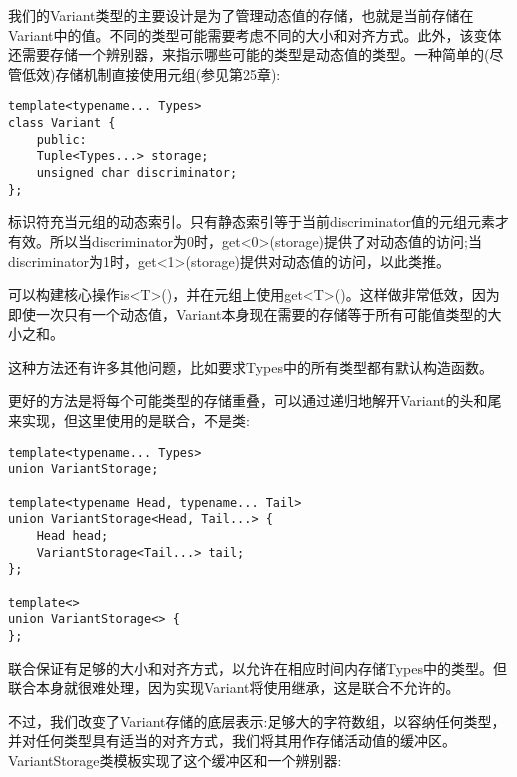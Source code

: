我们的Variant类型的主要设计是为了管理动态值的存储，也就是当前存储在Variant中的值。不同的类型可能需要考虑不同的大小和对齐方式。此外，该变体还需要存储一个辨别器，来指示哪些可能的类型是动态值的类型。一种简单的(尽管低效)存储机制直接使用元组(参见第25章):

\begin{lstlisting}[style=styleCXX]
template<typename... Types>
class Variant {
	public:
	Tuple<Types...> storage;
	unsigned char discriminator;
};
\end{lstlisting}

标识符充当元组的动态索引。只有静态索引等于当前discriminator值的元组元素才有效。所以当discriminator为0时，get<0>(storage)提供了对动态值的访问;当discriminator为1时，get<1>(storage)提供对动态值的访问，以此类推。

可以构建核心操作is<T>()，并在元组上使用get<T>()。这样做非常低效，因为即使一次只有一个动态值，Variant本身现在需要的存储等于所有可能值类型的大小之和。

\begin{tcolorbox}[colback=webgreen!5!white,colframe=webgreen!75!black]
\hspace*{0.75cm}这种方法还有许多其他问题，比如要求Types中的所有类型都有默认构造函数。
\end{tcolorbox}

更好的方法是将每个可能类型的存储重叠，可以通过递归地解开Variant的头和尾来实现，但这里使用的是联合，不是类:

\begin{lstlisting}[style=styleCXX]
template<typename... Types>
union VariantStorage;

template<typename Head, typename... Tail>
union VariantStorage<Head, Tail...> {
	Head head;
	VariantStorage<Tail...> tail;
};

template<>
union VariantStorage<> {
};
\end{lstlisting}

联合保证有足够的大小和对齐方式，以允许在相应时间内存储Types中的类型。但联合本身就很难处理，因为实现Variant将使用继承，这是联合不允许的。

不过，我们改变了Variant存储的底层表示:足够大的字符数组，以容纳任何类型，并对任何类型具有适当的对齐方式，我们将其用作存储活动值的缓冲区。VariantStorage类模板实现了这个缓冲区和一个辨别器:

